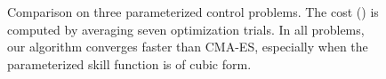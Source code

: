 \begin{figure}
  \caption{Comparison on three parameterized control problems. The
    cost () is computed by averaging seven
    optimization trials. In all problems, our algorithm converges
    faster than CMA-ES, especially when the parameterized skill
    function is of cubic form.}
  
  \label{fig:optskills_iter_values}
\end{figure}


